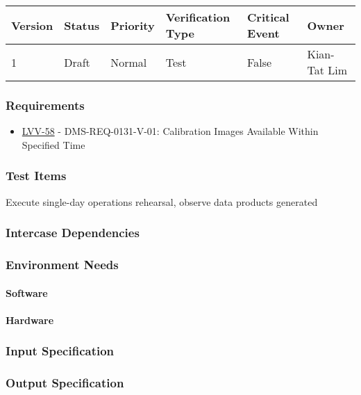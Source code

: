 \begin{longtable}[]{llllll}
\toprule
Version & Status & Priority & Verification Type & Critical Event & Owner
\\\midrule
1 & Draft & Normal &
Test & False & Kian-Tat Lim
\\\bottomrule
\end{longtable}

\subsubsection{Requirements}
\begin{itemize}
\item \href{https://jira.lsstcorp.org/browse/LVV-58}{LVV-58} - DMS-REQ-0131-V-01: Calibration Images Available Within Specified Time
\end{itemize}

\subsubsection{Test Items}
Execute single-day operations rehearsal, observe data products generated



\subsubsection{Intercase Dependencies}

\subsubsection{Environment Needs}

\paragraph{Software}

\paragraph{Hardware}

\subsubsection{Input Specification}

\subsubsection{Output Specification}

